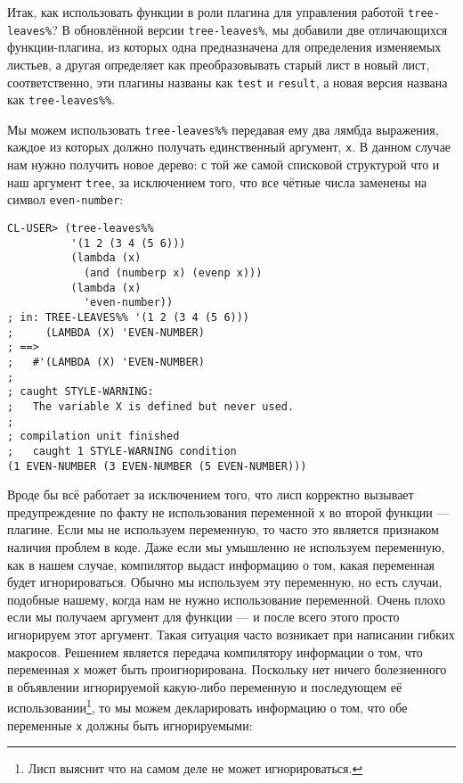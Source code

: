 Итак, как использовать функции в роли плагина для управления работой \verb"tree-leaves%"? В обновлённой версии \verb"tree-leaves%", мы добавили две отличающихся функции-плагина, из которых одна предназначена для определения изменяемых листьев, а другая определяет как преобразовывать старый лист в новый лист, соответственно, эти плагины названы как \verb"test" и \verb"result", а новая версия названа как \verb"tree-leaves%%".

Мы можем использовать \verb"tree-leaves%%" передавая ему два лямбда выражения, каждое из которых должно получать единственный аргумент, \verb"x". В данном случае нам нужно получить новое дерево: с той же самой списковой структурой что и наш аргумент \verb"tree", за исключением того, что все чётные числа заменены на символ \verb"even-number":

\begin{verbatim}
CL-USER> (tree-leaves%%
          '(1 2 (3 4 (5 6)))
          (lambda (x)
            (and (numberp x) (evenp x)))
          (lambda (x)
            'even-number))
; in: TREE-LEAVES%% '(1 2 (3 4 (5 6)))
;     (LAMBDA (X) 'EVEN-NUMBER)
; ==>
;   #'(LAMBDA (X) 'EVEN-NUMBER)
; 
; caught STYLE-WARNING:
;   The variable X is defined but never used.
; 
; compilation unit finished
;   caught 1 STYLE-WARNING condition
(1 EVEN-NUMBER (3 EVEN-NUMBER (5 EVEN-NUMBER)))
\end{verbatim}

Вроде бы всё работает за исключением того, что лисп корректно вызывает предупреждение по факту не использования переменной \verb"x" во второй функции --- плагине. Если мы не используем переменную, то часто это является признаком наличия проблем в коде. Даже если мы умышленно не используем переменную, как в нашем случае, компилятор выдаст информацию о том, какая переменная будет игнорироваться. Обычно мы используем эту переменную, но есть случаи, подобные нашему, когда нам не нужно использование переменной. Очень плохо если мы получаем аргумент для функции --- и после всего этого просто игнорируем этот аргумент. Такая ситуация часто возникает при написании гибких макросов. Решением является передача компилятору информации о том, что переменная \verb"x" может быть проигнорирована. Поскольку нет ничего болезненного в объявлении игнорируемой какую-либо переменную и последующем её использовании\footnote{Лисп выяснит что на самом деле не может игнорироваться.}, то мы можем декларировать информацию о том, что обе переменные \verb"x" должны быть игнорируемыми:



